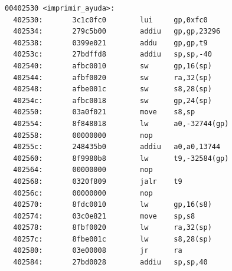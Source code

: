 \documentclass[11pt]{article}
\begin{document}
\begin{verbatim}
00402530 <imprimir_ayuda>:
  402530:       3c1c0fc0        lui     gp,0xfc0
  402534:       279c5b00        addiu   gp,gp,23296
  402538:       0399e021        addu    gp,gp,t9
  40253c:       27bdffd8        addiu   sp,sp,-40
  402540:       afbc0010        sw      gp,16(sp)
  402544:       afbf0020        sw      ra,32(sp)
  402548:       afbe001c        sw      s8,28(sp)
  40254c:       afbc0018        sw      gp,24(sp)
  402550:       03a0f021        move    s8,sp
  402554:       8f848018        lw      a0,-32744(gp)
  402558:       00000000        nop
  40255c:       248435b0        addiu   a0,a0,13744
  402560:       8f9980b8        lw      t9,-32584(gp)
  402564:       00000000        nop
  402568:       0320f809        jalr    t9
  40256c:       00000000        nop
  402570:       8fdc0010        lw      gp,16(s8)
  402574:       03c0e821        move    sp,s8
  402578:       8fbf0020        lw      ra,32(sp)
  40257c:       8fbe001c        lw      s8,28(sp)
  402580:       03e00008        jr      ra
  402584:       27bd0028        addiu   sp,sp,40


\end{verbatim}
\end{document}
